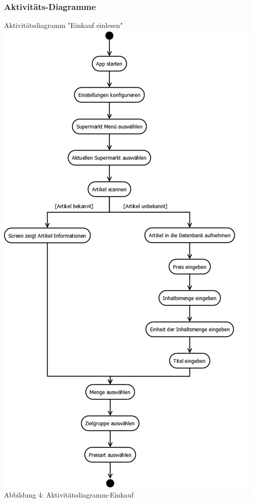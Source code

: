 \documentclass[12pt,a4paper]{article}
\begin{document}
\subsubsection*{Aktivitäts-Diagramme}
Aktivitätsdiagramm "Einkauf einlesen"
\\
\includegraphics[scale=0.6, origin=l]{Aktivitaets-Diagramm.png}
\\
\footnotesize Abbildung 4: Aktivitätsdiagramm-Einkauf
\normalsize
\end{document}
